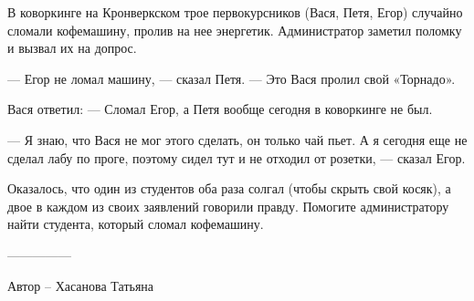 \question

В коворкинге на Кронверкском трое первокурсников (Вася, Петя, Егор) случайно сломали кофемашину, пролив на нее энергетик. Администратор заметил поломку и вызвал их на допрос. 

— Егор не ломал машину, — сказал Петя. — Это Вася пролил свой «Торнадо». 

Вася ответил: — Сломал Егор, а Петя вообще сегодня в коворкинге не был. 

— Я знаю, что Вася не мог этого сделать, он только чай пьет. А я сегодня еще не сделал лабу по проге, поэтому сидел тут и не отходил от розетки, — сказал Егор. 

Оказалось, что один из студентов оба раза солгал (чтобы скрыть свой косяк), а двое в каждом из своих заявлений говорили правду. Помогите администратору найти студента, который сломал кофемашину. 

---------------

Автор -- Хасанова Татьяна